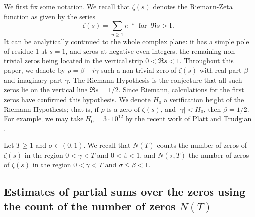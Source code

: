 \documentclass[10pt]{amsart}
\theoremstyle{definition}
\numberwithin{equation}{section}
\begin{document}
We first fix some notation. 
We recall that $\zeta(s)$ denotes the Riemann-Zeta function as given by the series
\[
\zeta(s) = \sum_{n\ge 1} n^{-s} \ \text{ for }\ \Re s>1.
\]
It can be analytically continued to the whole complex plane: it has a simple pole of residue 1 at $s=1$, and zeros at negative even integers, the remaining non-trivial zeros being located in the vertical strip $0<\Re s<1$. 
Throughout this paper, we denote by $\rho = \beta + i\gamma$ such a non-trivial zero of $\zeta(s)$ with real part $\beta$ and imaginary part $\gamma$. 
The Riemann Hypothesis is the conjecture that all such zeros lie on the vertical line $\Re s=1/2$.
Since Riemann, calculations for the first zeros have confirmed this hypothesis. We denote $H_0$ a verification height of the Riemann Hypothesis; that is, if $\rho$ is a zero of $\zeta(s)$, and
$|\gamma| < H_0$, then $\beta = 1/2$. 
For example, we may take $H_0 = 3 \cdot 10^{12}$ by the recent work of Platt and Trudgian  \cite{PlaTru21RH}.

Let $T\ge 1$ and $\sigma\in (0,1)$. 
We recall that $N(T)$
counts the number of zeros of $\zeta(s)$ in the region $0 < \gamma < T$ and $0 < \beta < 1$, and $N(\sigma, T)$
the number of zeros of $\zeta(s)$ in the region $0 < \gamma < T$ and $\sigma \le \beta < 1$.

\subsection{Estimates of partial sums over the zeros using the count of the number of zeros $N(T)$}\label{section-N(T)}
\end{document}
